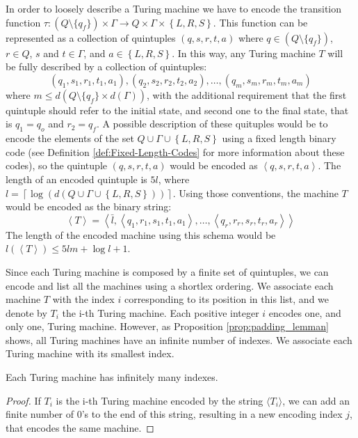 \begin{example}
\label{ex:Encoding_TM}
In order to loosely describe a Turing machine we have to encode the transition function $\tau:\left(Q\setminus \{q_{f}\}\right)\times\Gamma\rightarrow Q\times\Gamma\times\left\{ L,R,S\right\}$. This function can be represented as a collection of quintuples $\left(q,s,r,t,a\right)$ where $q \in \left(Q\setminus \{q_{f}\}\right)$, $r \in Q$, $s$ and $t\in\Gamma$, and $a\in\left\{ L,R,S\right\}$. In this way, any Turing machine $T$ will be fully described by a collection of quintuples:
\[
\left(q_{1},s_{1},r_{1},t_{1},a_{1}\right),\left(q_{2},s_{2},r_{2},t_{2},a_{2}\right),\ldots,\left(q_{m},s_
{m},r_{m},t_{m},a_{m}\right)
\]
where $m \leq d\left(Q\setminus \{q_{f}\} \times d(\Gamma) \right)$, with the additional requirement that the first quintuple should refer to the initial state, and second one to the final state, that is $q_{1} = q_{o}$ and $r_{2} = q_{f}$. A possible description of these quituples would be to encode the elements of the set $Q\cup\Gamma\cup\left\{ L, R, S \right\}$ using a fixed length binary code (see Definition \ref{def:Fixed-Length-Codes} for more information about these codes), so the quintuple $\left(q,s,r,t,a\right)$ would be encoded as $\left\langle q, s, r, t, a \right\rangle$. The length of an encoded quintuple is $5l$, where $l=\left\lceil \log\left(d\left(Q\cup\Gamma\cup\left\{ L,R,S\right\} \right)\right)\right\rceil$. Using those conventions, the machine $T$ would be encoded as the binary string:
\[
\left\langle T \right\rangle = \left\langle \bar{l}, \left\langle q_{1}, r_{1}, s_{1}, t_{1}, a_{1} \right\rangle, \ldots, \left\langle q_{r}, r_{r}, s_{r}, t_{r}, a_{r} \right\rangle \right\rangle 
\]
The length of the encoded machine using this schema would be $l(\left\langle T \right\rangle) \leq 5lm + \log l + 1$.
\end{example}

Since each Turing machine is composed by a finite set of quintuples, we can encode and list all the machines using a shortlex ordering. We associate each machine $T$ with the index $i$ corresponding to its position in this list, and we denote by $T_i$ the i-th Turing machine. Each positive integer $i$ encodes one, and only one, Turing machine. However, as Proposition \ref{prop:padding_lemman} shows, all Turing machines have an infinite number of indexes. We associate each Turing machine with its smallest index.

\begin{proposition}
\label{prop:padding_lemman}
Each Turing machine has infinitely many indexes.
\end{proposition}
\begin{proof}
If $T_i$ is the i-th Turing machine encoded by the string $\langle T_i \rangle$, we can add an finite number of 0's to the end of this string, resulting in a new encoding index $j$, that encodes the same machine.
\end{proof}

